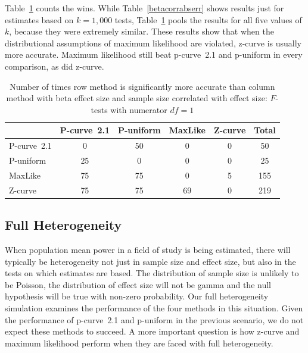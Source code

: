 \documentclass[jou]{apa6} %
\begin{document}
Table~\ref{violationcontest} counts the wins.  While Table~\ref{betacorrabserr} shows results just for estimates based on $k = 1,000$ tests, Table~\ref{violationcontest} pools the results for all five values of $k$, because they were extremely similar. These results show that when the distributional assumptions of maximum likelihood are violated, z-curve is usually more accurate. Maximum likelihood still beat p-curve~2.1 and p-uniform in every comparison, as did z-curve. 


\begin{table}[h]
\caption{Number of times row method is significantly more accurate than column method with beta effect size and sample size correlated with effect size: $F$-tests with numerator $df=1$}
{\small
\begin{center}
\begin{tabular}{lccccc}  \hline
          & P-curve~2.1   & P-uniform & MaxLike & Z-curve &   Total     \\ \hline
P-curve~2.1   &    0      &   50      &     0   &   0     &    50       \\
P-uniform &   25      &    0      &     0   &   0     &    25       \\
MaxLike   &   75      &    75     &     0   &   5     &   155       \\
Z-curve   &   75      &    75     &    69   &   0     &   219       \\ \hline
\end{tabular}
\end{center}
} %
\label{violationcontest}  %
\end{table}

\subsection{Full Heterogeneity} \label{FULL}

When population mean power in a field of study is being estimated, there will typically be heterogeneity not just in sample size and effect size, but also in the tests on which estimates are based. The distribution of sample size is unlikely to be Poisson, the distribution of effect size will not be gamma and the null hypothesis will be true with non-zero probability. Our full heterogeneity simulation examines the performance of the four methods in this situation. Given the performance of p-curve~2.1 and p-uniform in the previous scenario, we do not expect these methods to succeed.  A more important question is how z-curve and maximum likelihood perform when they are faced with full heterogeneity. 
\end{document}
